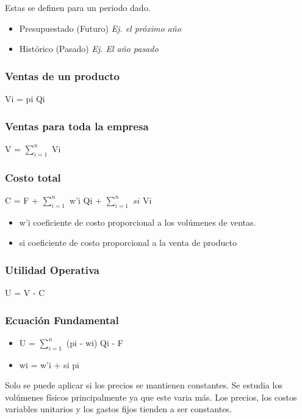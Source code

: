 \documentclass[titlepage,a4paper]{article}
\begin{document}
\medskip
Estas se definen para un periodo dado.

\begin{itemize}
\item Presupuestado (Futuro) \textit{Ej. el próximo año}
\item Histórico (Pasado) \textit{Ej. El año pasado}
\end{itemize}


\subsubsection*{Ventas de un producto}
Vi = pi Qi

\subsubsection*{Ventas para toda la empresa}
V = $\sum_{i=1}^n$ Vi

\subsubsection*{Costo total}
C = F + $\sum_{i=1}^n$ w'i Qi + $\sum_{i=1}^n$ $si$ Vi

\begin{itemize}
\item w'i coeficiente de costo proporcional a los volúmenes de ventas.
\item si coeficiente de costo proporcional a la venta de producto
\end{itemize}


\subsubsection*{Utilidad Operativa}
U = V - C

\subsubsection*{Ecuación Fundamental}
\begin{itemize}
\item U = $\sum_{i=1}^n$ (pi - wi) Qi - F
\item wi = w'i + si pi
\end{itemize}



Solo se puede aplicar si los precios se mantienen constantes.
Se estudia los volúmenes físicos principalmente ya que este varia más.
Los precios, los costos variables unitarios y los gastos fijos tienden a ser constantes.
\end{document}
